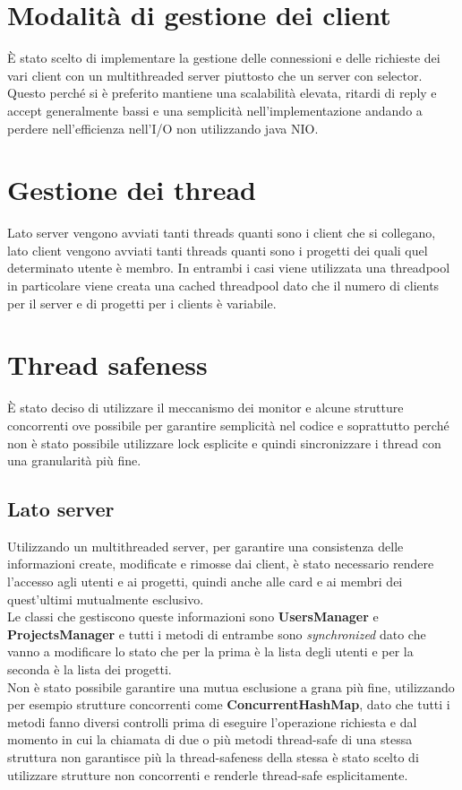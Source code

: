 \documentclass[11pt]{report}
\begin{document}
	\section{Modalità di gestione dei client}
	È stato scelto di implementare la gestione delle connessioni e delle richieste dei vari client con un multithreaded server piuttosto che un server con selector.
	Questo perché si è preferito mantiene una scalabilità elevata, ritardi di reply e accept generalmente bassi e una semplicità nell'implementazione andando a perdere nell'efficienza nell'I/O non utilizzando java NIO.
	
	\section{Gestione dei thread}
	Lato server vengono avviati tanti threads quanti sono i client che si collegano, lato client vengono avviati tanti threads quanti sono i progetti dei quali quel determinato utente è membro.
	In entrambi i casi viene utilizzata una threadpool in particolare viene creata una cached threadpool dato che il numero di clients per il server e di progetti per i clients è variabile.
	
	\section{Thread safeness}
	È stato deciso di utilizzare il meccanismo dei monitor e alcune strutture concorrenti ove possibile per garantire semplicità nel codice e soprattutto perché non è stato possibile utilizzare lock esplicite e quindi sincronizzare i thread con una granularità più fine.
	
	\subsection{Lato server}
	Utilizzando un multithreaded server, per garantire una consistenza delle informazioni create, modificate e rimosse dai client, è stato necessario rendere l'accesso agli utenti e ai progetti, quindi anche alle card e ai membri dei quest'ultimi mutualmente esclusivo.\\
	Le classi che gestiscono queste informazioni sono \textbf{UsersManager} e \textbf{ProjectsManager} e tutti i metodi di entrambe sono \textit{synchronized} dato che vanno a modificare lo stato che per la prima è la lista degli utenti e per la seconda è la lista dei progetti.\\
	Non è stato possibile garantire una mutua esclusione a grana più fine, utilizzando per esempio strutture concorrenti come \textbf{ConcurrentHashMap}, dato che tutti i metodi fanno diversi controlli prima di eseguire l'operazione richiesta e dal momento in cui la chiamata di due o più metodi thread-safe di una stessa struttura non garantisce più la thread-safeness della stessa è stato scelto di utilizzare strutture non concorrenti e renderle thread-safe esplicitamente.
	
\end{document}
